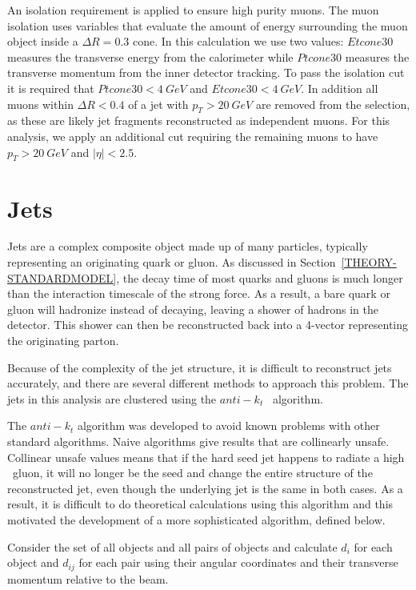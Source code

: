 An isolation requirement is applied to ensure high purity muons. The muon isolation uses variables that evaluate the amount of energy surrounding the muon object inside a $\Delta R=0.3$ cone. In this calculation we use two values: $Etcone30$ measures the transverse energy from the calorimeter while $Ptcone30$ measures the transverse momentum from the inner detector tracking. To pass the isolation cut it is required that $Ptcone30 < 4\ GeV$ and $Etcone30 < 4\ GeV$. In addition all muons within $\Delta R < 0.4$ of a jet with $p_T > 20\ GeV$ are removed from the selection, as these are likely jet fragments reconstructed as independent muons. For this analysis, we apply an additional cut requiring the remaining muons to have $p_T > 20\ GeV$ and $|\eta| < 2.5$. 

\section{Jets}
\label{SECTION-DEFINEJETS}
Jets are a complex composite object made up of many particles, typically representing an originating quark or gluon. 
As discussed in Section~\ref{THEORY-STANDARDMODEL}, the decay time of most quarks and gluons is much longer than the interaction timescale of the strong force. As a result, a bare quark or gluon will hadronize instead of decaying, leaving a shower of hadrons in the detector. This shower can then be reconstructed back into a 4-vector representing the originating parton.

Because of the complexity of the jet structure, it is difficult to reconstruct jets accurately, and there are several different methods to approach this problem. The jets in this analysis are clustered using the $anti-k_t$~\cite{AntiKt} algorithm.

The $anti-k_t$ algorithm was developed to avoid known problems with other standard algorithms. Naive algorithms give results that are collinearly unsafe. Collinear unsafe values means that if the hard seed jet happens to radiate a high \pT\ gluon, it will no longer be the seed and change the entire structure of the reconstructed jet, even though the underlying jet is the same in both cases. As a result, it is difficult to do theoretical calculations using this algorithm and this motivated the development of a more sophisticated algorithm, defined below.

Consider the set of all objects and all pairs of objects and calculate $d_{i}$ for each object and $d_{ij}$ for each pair using their angular coordinates and their transverse momentum relative to the beam.


